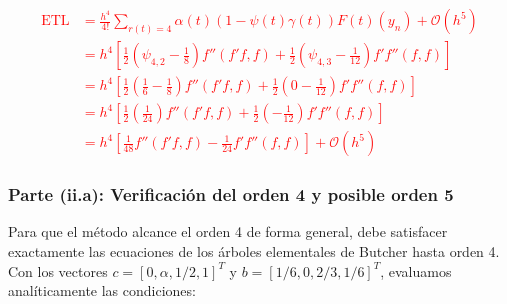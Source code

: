 \begin{sol}
\textcolor{red}{\begin{align*}
\text{ETL} & = \frac{h^4}{4!} \sum_{r(t)=4} \alpha(t) \left( 1-\psi(t) \gamma(t) \right) F(t)(y_n) + \mathcal{O}(h^5) \\
&= h^4 \left[ \frac{1}{2} \left( \psi_{4,2} - \frac{1}{8} \right) f''(f'f, f) + \frac{1}{2} \left( \psi_{4,3} - \frac{1}{12} \right) f' f''(f, f) \right] \\
&= h^4 \left[ \frac{1}{2} \left( \frac{1}{6} - \frac{1}{8} \right) f''(f'f, f) + \frac{1}{2} \left( 0 - \frac{1}{12} \right) f' f''(f, f) \right] \\
&= h^4 \left[ \frac{1}{2} \left( \frac{1}{24} \right) f''(f'f, f) + \frac{1}{2} \left( -\frac{1}{12} \right) f' f''(f, f) \right] \\
&= h^4 \left[ \frac{1}{48} f''(f'f, f) - \frac{1}{24} f' f''(f, f) \right] + \mathcal{O}(h^5)
\end{align*}}

\subsubsection*{Parte (ii.a): Verificación del orden 4 y posible orden 5}
Para que el método alcance el orden 4 de forma general, debe satisfacer exactamente las ecuaciones de los árboles elementales de Butcher hasta orden 4. Con los vectores $c = [0, \alpha, 1/2, 1]^T$ y $b = [1/6, 0, 2/3, 1/6]^T$, evaluamos analíticamente las condiciones:


\end{sol}
